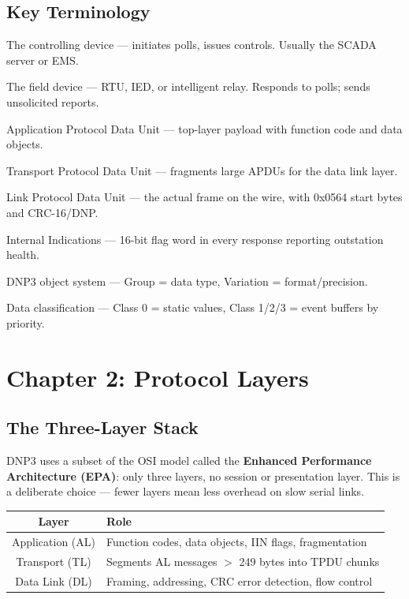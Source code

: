 \documentclass[11pt,twoside]{article}
\begin{document}
\subsection{Key Terminology}

\begin{description}[style=nextline, leftmargin=2cm, labelwidth=1.8cm]
  \item[Master] The controlling device --- initiates polls, issues controls. Usually the SCADA server or EMS.
  \item[Outstation] The field device --- RTU, IED, or intelligent relay. Responds to polls; sends unsolicited reports.
  \item[APDU] Application Protocol Data Unit --- top-layer payload with function code and data objects.
  \item[TPDU] Transport Protocol Data Unit --- fragments large APDUs for the data link layer.
  \item[LPDU] Link Protocol Data Unit --- the actual frame on the wire, with 0x0564 start bytes and CRC-16/DNP.
  \item[IIN] Internal Indications --- 16-bit flag word in every response reporting outstation health.
  \item[Group/Var] DNP3 object system --- Group = data type, Variation = format/precision.
  \item[Class 0/1/2/3] Data classification --- Class 0 = static values, Class 1/2/3 = event buffers by priority.
\end{description}

\section{Chapter 2: Protocol Layers}

\subsection{The Three-Layer Stack}

DNP3 uses a subset of the OSI model called the \textbf{Enhanced Performance Architecture (EPA)}: only three layers, no session or presentation layer. This is a deliberate choice --- fewer layers mean less overhead on slow serial links.

\begin{center}
\begin{tabularx}{0.75\textwidth}{|c|X|}
\hline
\textbf{Layer} & \textbf{Role} \\
\hline
Application (AL) & Function codes, data objects, IIN flags, fragmentation \\
Transport (TL) & Segments AL messages $>$ 249 bytes into TPDU chunks \\
Data Link (DL) & Framing, addressing, CRC error detection, flow control \\
\hline
\end{tabularx}
\end{center}
\end{document}
